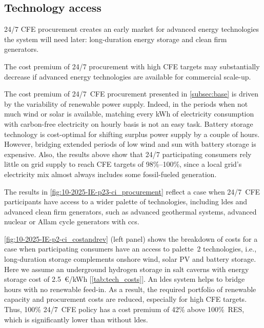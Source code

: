 \subsection{Technology access}
\label{subsec:palette}

\begin{res}
    24/7 CFE procurement creates an early market for advanced energy technologies the system will need later: long-duration energy storage and clean firm generators.
\end{res}

\begin{res}
    The cost premium of 24/7 procurement with high CFE targets may substantially decrease if advanced energy technologies are available for commercial scale-up. 
\end{res}

The cost premium of 24/7~CFE procurement presented in \cref{subsec:base} is driven by the variability of renewable power supply.
Indeed, in the periods when not much wind or solar is available, matching every kWh of electricity consumption with carbon-free electricity on hourly basis is not an easy task.
Battery storage technology is cost-optimal for shifting surplus power supply by a couple of hours.
However, bridging extended periods of low wind and sun with battery storage is expensive.
Also, the results above show that 24/7 participating consumers rely little on grid supply to reach CFE targets of 98\%--100\%, since a local grid's electricity mix almost always includes some fossil-fueled generation.

The results in \cref{fig:10-2025-IE-p23-ci_procurement} reflect a case when 24/7~CFE participants have access to a wider palette of technologies, including \gls{ldes} and advanced clean firm generators, such as advanced geothermal systems, advanced nuclear or Allam cycle generators with \gls{ccs}.

\cref{fig:10-2025-IE-p2-ci_costandrev} (left panel) shows the breakdown of costs for a case when participating consumers have an access to palette~2 technologies, i.e., long-duration storage complements onshore wind, solar PV and battery storage.
Here we assume an underground hydrogen storage in salt caverns with energy storage cost of 2.5~\euro/kWh [\cref{tab:tech_costs}].
An \gls{ldes} system helps to bridge hours with no renewable feed-in. 
As a result, the required portfolio of renewable capacity and procurement costs are reduced, especially for high CFE targets.
Thus, 100\% 24/7~CFE policy has a cost premium of 42\% above 100\%~RES, which is significantly lower than without \gls{ldes}.

